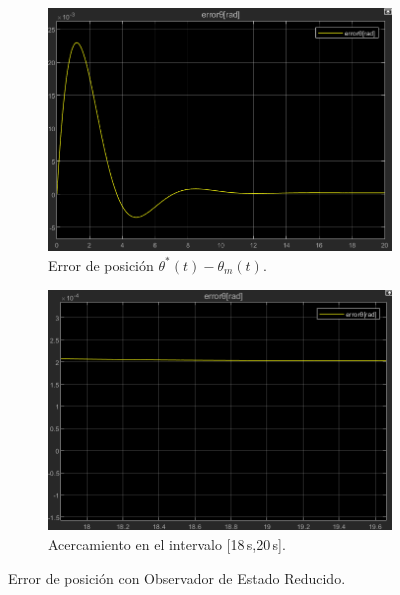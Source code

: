 \documentclass{article}
\begin{document}
\begin{figure}[H]
    \centering
    \begin{subfigure}[t]{0.45\textwidth}
        \centering
        \includegraphics[width=\textwidth]{Imagenes/ErrorPosicionPerturbacion.png}
        \caption{Error de posición \(\theta^*(t)-\theta_m(t)\).}
        \label{fig:ErrorPosicionPerturbacion}
    \end{subfigure}
    \hfill %
    \begin{subfigure}[t]{0.45\textwidth}
        \centering
        \includegraphics[width=\textwidth]{Imagenes/AcercamientoErrorPosicionPerturbacion.png}
        \caption{Acercamiento en el intervalo [18\,s,20\,s].}
        \label{fig:AcercamientoErrorPosicionPerturbacion}
    \end{subfigure}
    \caption{Error de posición con Observador de Estado Reducido.}
    \label{fig:Error_posicion_observador_Reducido}
\end{figure}
\end{document}
